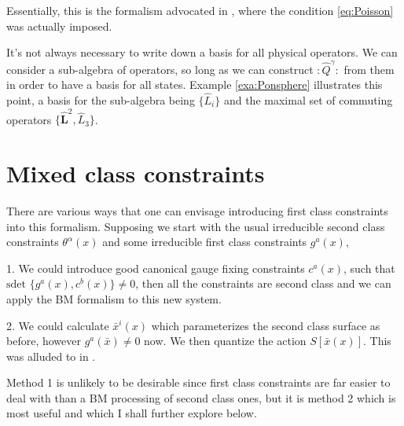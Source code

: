 \documentclass[a4paper,12pt]{article}
\theoremstyle{definition}
\theoremstyle{remark}
\numberwithin{equation}{section}
\newcommand{\al}{\alpha}
\newcommand{\ga}{\gamma}
\newcommand{\Lh}{\hat{L}}
\newcommand{\Qh}{\hat{Q}}
\newcommand{\Lhb}{\mathbf{\hat{L}}}
\newcommand{\bx}{\bar{x}}
\begin{document}
Essentially, this is the formalism advocated in
\cite{Lyakhovich:2001cm}, where the condition \eqref{eq:Poisson}
was actually imposed.

It's not always necessary to write down a basis for all physical
operators. We can consider a sub-algebra of operators, so long as we
can construct $:\Qh^{\ga}:$ from them in order to have a basis for
all states. Example \ref{exa:Ponsphere} illustrates this point, a
basis for the sub-algebra being $\{\Lh_i\}$ and the maximal set
of commuting operators $\{\Lhb^2, \Lh_3\}$.



\section{Mixed class constraints}

There are various ways that one can envisage introducing first
class constraints into this formalism. Supposing we start with the
usual irreducible second class constraints $\theta^{\al}(x)$ and
some irreducible first class constraints $g^a(x)$,

1. We could introduce good canonical gauge fixing constraints
\cite{Henneaux:1992ig} $c^a(x)$, such that $\text{sdet }
\{g^a(x),c^b(x)\} \neq 0$, then all the constraints are second
class and we can apply the BM formalism to this new system.

2. We could calculate $\bx^i(x)$ which parameterizes the second
class surface as before, however $g^a(\bx) \neq 0$ now. We then
quantize the action $S[\bx(x)]$. This was alluded to in
\cite{Lyakhovich:2001cm}.

Method 1 is unlikely to be desirable since first class constraints
are far easier to deal with than a BM processing of second class
ones, but it is method 2 which is most useful and which I shall
further explore below.
\end{document}
